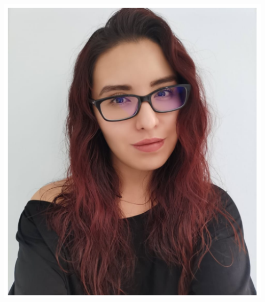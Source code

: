\documentclass[
]{book}
\begin{document}
\begin{center}\includegraphics[width=6.54in]{img/lizzy} \end{center}

  
\end{document}
